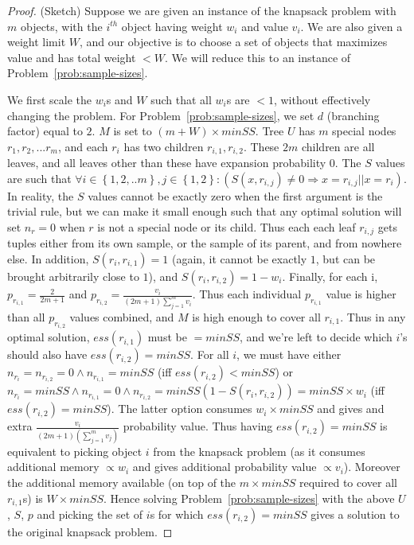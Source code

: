 \begin{proof}(Sketch)
Suppose we are given an instance of the knapsack problem with $m$ objects, with the $i^{th}$ object having weight $w_i$ and value $v_i$. We are also given a weight limit $W$, and our objective is to choose a set of objects that maximizes value and has total weight $< W$. We will reduce this to an instance of Problem~\ref{prob:sample-sizes}.

We first scale the $w_i$s and $W$ such that all $w_i$s are $< 1$, without effectively changing the problem. For Problem~\ref{prob:sample-sizes}, we set $d$ (branching factor) equal to $2$. $M$ is set to $(m + W) \times minSS$. Tree $U$ has $m$ special nodes $r_1, r_2, ... r_m$, and each $r_i$ has two children $r_{i,1}, r_{i,2}$. These $2m$ children are all leaves, and all leaves other than these have expansion probability $0$. 
The $S$ values are such that $\forall i \in \left\lbrace 1, 2, ..m\right\rbrace, j \in \left\lbrace 1, 2 \right\rbrace : (S(x, r_{i,j}) \neq 0 \Rightarrow x = r_{i,j} || x = r_i)$. In reality, the $S$ values cannot be exactly zero when the first argument is the trivial rule, but we can make it small enough such that any optimal solution will set $n_r = 0$ when $r$ is not a special node or its child. Thus each each leaf $r_{i,j}$ gets tuples either from its own sample, or the sample of its parent, and from nowhere else. In addition, $S(r_i, r_{i,1}) = 1$ (again, it cannot be exactly $1$, but can be brought arbitrarily close to $1$), and $S(r_i, r_{i,2}) = 1 - w_i$. Finally, for each i, $p_{r_{i,1}} = \frac{2}{2m+1}$ and $p_{r_{i,2}} = \frac{v_i}{(2m+1)\sum_{j=1}^{m}v_i}$. Thus each individual $p_{r_{i,1}}$ value is higher than all $p_{r_{i,2}}$ values combined, and $M$ is high enough to cover all $r_{i,1}$. Thus in any optimal solution, $ess(r_{i,1})$ must be $= minSS$, and we're left to decide which $i$'s should also have $ess(r_{i,2}) = minSS$. For all $i$, we must have either $n_{r_i} = n_{r_{i,2}} = 0 \land n_{r_{i,1}} = minSS$ (iff $ess(r_{i,2}) < minSS$) or $n_{r_i} = minSS \land n_{r_{i,1}} = 0 \land n_{r_{i,2}} = minSS (1 - S(r_i, r_{i,2})) = minSS \times w_i$ (iff $ess(r_{i,2}) = minSS$). The latter option consumes $w_i \times minSS$ and gives and extra $\frac{v_i}{(2m+1)(\sum_{j=1}^{m}v_j)}$ probability value. Thus having $ess(r_{i,2}) = minSS$ is equivalent to picking object $i$ from the knapsack problem (as it consumes additional memory $\propto w_i$ and gives additional probability value $\propto v_i$). Moreover the additional memory available (on top of the $m \times minSS$ required to cover all $r_{i,1}$s) is $W\times minSS$. Hence solving Problem~\ref{prob:sample-sizes} with the above $U$, $S$, $p$ and picking the set of $i$s for which $ess(r_{i,2}) = minSS$ gives a solution to the original knapsack problem. 
\end{proof}

